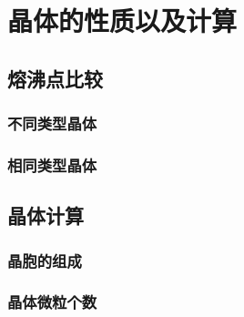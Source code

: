 \documentclass[a4paper]{article}
\begin{document}
	
	\clearpage
	\section{晶体的性质以及计算}
	
	
	\subsection{熔沸点比较}
	
	\subsubsection{不同类型晶体}
	
	
	\subsubsection{相同类型晶体}
	
	
	\subsection{晶体计算}
	
	\subsubsection{晶胞的组成}
	
	\subsubsection{晶体微粒个数}
	
\end{document}
